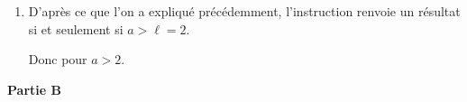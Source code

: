 \begin{enumerate}
\begin{enumerate}
			La boucle \texttt{while} se termine donc après $N_0$ itérations, et \texttt{rang}(2.000001) renvoie la valeur $N_0$.

			Le seul risque que l'algorithme ne se termine pas avec un $a > 2$ serait que le réel $a$ soit trop proche de 2, et que les algorithmes utilisés par python donnent une valeur approchée trop peu précise des différents termes $u_n$ pour que la boucle se termine.

			\item D'après ce que l'on a expliqué précédemment, l'instruction renvoie un résultat si et seulement si $a > \ell = 2$.

			Donc pour $a > 2$.
		\end{enumerate}
	\end{enumerate}

	\bigskip

	\textbf{Partie B}

	\medskip

